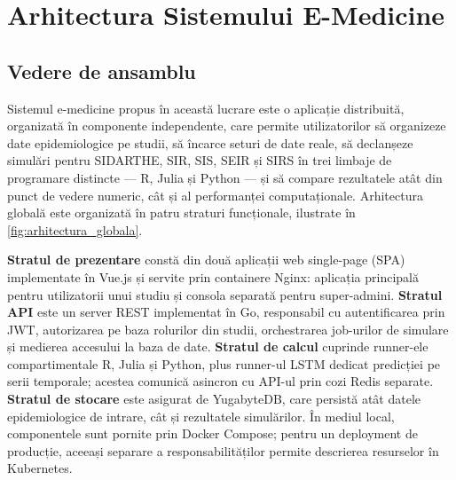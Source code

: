
\chapter{Arhitectura Sistemului E-Medicine}
\label{ch:arhitectura}

\section{Vedere de ansamblu}
\label{sec:arhitectura_overview}

Sistemul e-medicine propus în această lucrare este o aplicație distribuită,
organizată în componente independente, care permite utilizatorilor să
organizeze date epidemiologice pe studii, să încarce seturi de date reale, să
declanșeze simulări pentru SIDARTHE, SIR, SIS, SEIR și SIRS în
trei limbaje de programare distincte --- R, Julia și Python --- și să compare
rezultatele atât din punct de vedere numeric, cât și al performanței
computaționale. Arhitectura globală este
organizată în patru straturi funcționale, ilustrate în
\cref{fig:arhitectura_globala}.

\textbf{Stratul de prezentare} constă din două aplicații web single-page
(SPA) implementate în Vue.js și servite prin containere Nginx: aplicația
principală pentru utilizatorii unui studiu și consola separată pentru
super-admini.
\textbf{Stratul API} este un server REST implementat în Go, responsabil cu
autentificarea prin JWT, autorizarea pe baza rolurilor din studii, orchestrarea
job-urilor de simulare și medierea accesului la baza de date.
\textbf{Stratul de calcul} cuprinde runner-ele compartimentale R, Julia și
Python, plus runner-ul LSTM dedicat predicției pe serii temporale; acestea
comunică asincron cu API-ul prin cozi Redis separate.
\textbf{Stratul de stocare} este asigurat de YugabyteDB, care persistă atât
datele epidemiologice de intrare, cât și rezultatele simulărilor. În mediul local,
componentele sunt pornite prin Docker Compose; pentru un deployment de producție,
aceeași separare a responsabilităților permite descrierea resurselor în Kubernetes.

